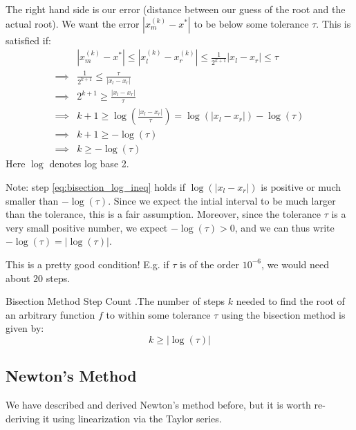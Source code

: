 \documentclass[12pt,letterpaper]{article}
\begin{document}
The right hand side is our error (distance between our guess of the root and the actual root). We want the error $\left\lvert x_m^{(k)} - x^* \right\lvert$ to be below some tolerance $\tau$. This is satisfied if:
\begin{align}
	& \left\lvert x_m^{(k)} - x^* \right\lvert
	\leq \left\lvert x_l^{(k)} - x_r^{(k)} \right\lvert
	\leq \frac{1}{2^{k+1}} \left\lvert x_l - x_r \right\lvert
	\leq \tau \\
	\implies & \frac{1}{2^{k+1}} \leq \frac{\tau}{\left\lvert x_l - x_r \right\lvert} \\
	\implies & 2^{k+1} \geq \frac{\left\lvert x_l - x_r \right\lvert}{\tau} \\
	\implies & k+1 \geq \log\left(\frac{\left\lvert x_l - x_r \right\lvert}{\tau}\right) = \log\left(\left\lvert x_l - x_r \right\lvert\right)-\log(\tau) \\
	\implies & k+1 \geq -\log(\tau) \label{eq:bisection_log_ineq} \\
	\implies & k \geq -\log(\tau)
\end{align}
Here $\log$ denotes log base 2.

Note: step \ref{eq:bisection_log_ineq} holds if $\log\left(\left\lvert x_l - x_r \right\lvert\right)$ is positive or much smaller than $-\log(\tau)$. Since we expect the intial interval to be much larger than the tolerance, this is a fair assumption.
Moreover, since the tolerance $\tau$ is a very small positive number, we expect $-\log(\tau) > 0$, and we can thus write $-\log(\tau) = \lvert \log(\tau) \rvert$.

This is a pretty good condition! E.g. if $\tau$ is of the order $10^{-6}$, we would need about $20$ steps.

\begin{theo}{Bisection Method Step Count}
.The number of steps $k$ needed to find the root of an arbitrary function $f$ to within some tolerance $\tau$ using the bisection method is given by:
\begin{equation} \label{eq:bisection_er}
	k \geq \big\lvert \log(\tau) \big\rvert
\end{equation}
\end{theo}

\subsection{Newton's Method}
We have described and derived Newton's method before, but it is worth re-deriving it using linearization via the Taylor series.
\end{document}
